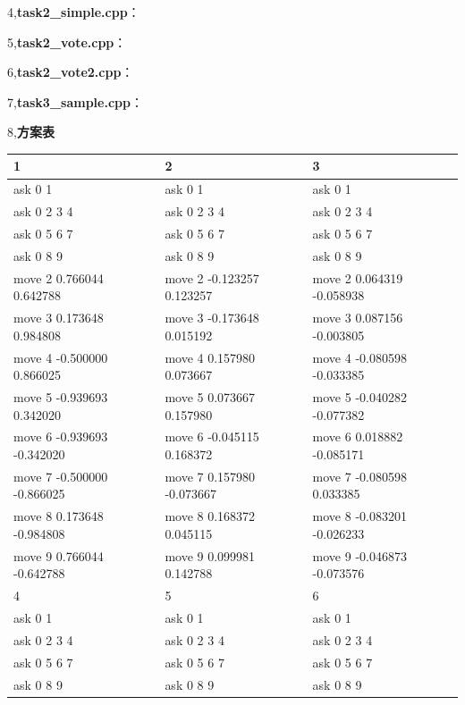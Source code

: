 \documentclass{ctexart}
\begin{document}
\begin{flushleft}
4,\textbf{task2\_simple.cpp}：


5,\textbf{task2\_vote.cpp}：


6,\textbf{task2\_vote2.cpp}：


7,\textbf{task3\_sample.cpp}：


8,\textbf{方案表}
\begin{table}[H]
  \centering
  \begin{tabular}{|l|l|l|}
  \hline
      1 & 2 & 3 \\ \hline
      ask 0 1 & ask 0 1 & ask 0 1 \\ \hline
      ask 0 2 3 4 & ask 0 2 3 4 & ask 0 2 3 4 \\ \hline
      ask 0 5 6 7 & ask 0 5 6 7 & ask 0 5 6 7 \\ \hline
      ask 0 8 9 & ask 0 8 9 & ask 0 8 9 \\ \hline
      move 2 0.766044 0.642788 & move 2 -0.123257 0.123257 & move 2 0.064319 -0.058938 \\ \hline
      move 3 0.173648 0.984808 & move 3 -0.173648 0.015192 & move 3 0.087156 -0.003805 \\ \hline
      move 4 -0.500000 0.866025 & move 4 0.157980 0.073667 & move 4 -0.080598 -0.033385 \\ \hline
      move 5 -0.939693 0.342020 & move 5 0.073667 0.157980 & move 5 -0.040282 -0.077382 \\ \hline
      move 6 -0.939693 -0.342020 & move 6 -0.045115 0.168372 & move 6 0.018882 -0.085171 \\ \hline
      move 7 -0.500000 -0.866025 & move 7 0.157980 -0.073667 & move 7 -0.080598 0.033385 \\ \hline
      move 8 0.173648 -0.984808 & move 8 0.168372 0.045115 & move 8 -0.083201 -0.026233 \\ \hline
      move 9 0.766044 -0.642788 & move 9 0.099981 0.142788 & move 9 -0.046873 -0.073576 \\ \hline
      4 & 5 & 6 \\ \hline
      ask 0 1 & ask 0 1 & ask 0 1 \\ \hline
      ask 0 2 3 4 & ask 0 2 3 4 & ask 0 2 3 4 \\ \hline
      ask 0 5 6 7 & ask 0 5 6 7 & ask 0 5 6 7 \\ \hline
      ask 0 8 9 & ask 0 8 9 & ask 0 8 9 \\ \hline

\end{tabular}
\end{table}
\end{flushleft}
\end{document}
